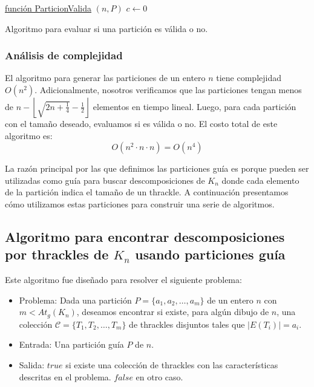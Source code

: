     \begin{algorithm}[htpb]
      \DontPrintSemicolon
      \underline{función ParticionValida} $(n,P)$\;
        $c \gets 0$\;
       \caption{Algoritmo para evaluar si una partición es válida o no.}
       \label{algo:is_partition_valid}
    \end{algorithm}
    \subsubsection{Análisis de complejidad}

    El algoritmo para generar las particiones de un entero $n$ tiene complejidad
    $O(n^2)$. Adicionalmente, nosotros verificamos que las particiones  tengan
    menos de $n - \left\lfloor\sqrt{2n + \frac{1}{4}} - \frac{1}{2}\right\rfloor$
    elementos en tiempo lineal. Luego, para cada partición con el tamaño deseado,
    evaluamos si es válida o no. El costo total de este algoritmo es:
    \[ O(n^2\cdot n \cdot n) = O(n^4)\]

    La razón principal por las que definimos las particiones guía es porque pueden ser utilizadas
    como guía para buscar descomposiciones de $K_n$ donde cada elemento de la partición indica
    el tamaño de un thrackle. A continuación presentamos cómo utilizamos estas particiones
    para construir una serie de algoritmos.

\subsection{Algoritmo para encontrar descomposiciones por thrackles de $K_n$
usando particiones guía}\label{secc:descomposiciones_particiones}

  Este algoritmo fue diseñado para resolver el siguiente problema:
  \begin{itemize}
    \item[] Problema: Dada una partición $P=\{a_1,a_2,\dots,a_m\}$ de un entero $n$ con
    $m < At_g(K_n)$, deseamos encontrar si existe, para algún dibujo de $n$, una colección
    $\mathcal{C}=\{T_1,T_2,\dots,T_m\}$ de thrackles disjuntos tales que $|E(T_i)| = a_i$.
    \item[] Entrada: Una partición guía $P$ de $n$.
    \item[] Salida: $true$ si existe una colección de thrackles con las características
    descritas en el problema. $false$ en otro caso.
  \end{itemize}

